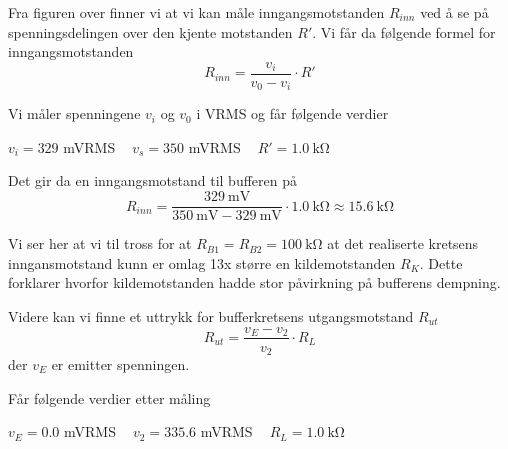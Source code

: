 Fra figuren over finner vi at vi kan måle inngangsmotstanden $R_{inn}$ ved å se på spenningsdelingen 
over den kjente motstanden $R'$. Vi får da følgende formel for inngangsmotstanden
\[
    R_{inn} = \frac{v_i}{v_{0} - v_i} \cdot R'
\]

Vi måler spenningene $v_i$ og $v_0$ i VRMS og får følgende verdier
\begin{center}
    $v_i = 329$ mVRMS $\:\:\:\:v_s = 350$ mVRMS $\:\:\:\:R' = \SI{1.0}{\kilo\ohm}$
\end{center}

Det gir da en inngangsmotstand til bufferen på
\[
    R_{inn} = \frac{\SI{329}{\milli\volt}}{\SI{350}{\milli\volt} - \SI{329}{\milli\volt}} \cdot \SI{1.0}{\kilo\ohm} \approx \SI{15.6}{\kilo\ohm}
\]

Vi ser her at vi til tross for at $R_{B1} = R_{B2} = \SI{100}{\kilo\ohm}$ at det realiserte kretsens 
inngansmotstand kunn er omlag 13x større en kildemotstanden $R_K$. Dette forklarer hvorfor kildemotstanden
hadde stor påvirkning på bufferens dempning.

Videre kan vi finne et uttrykk for bufferkretsens utgangsmotstand $R_{ut}$
\[
    R_{ut} = \frac{v_E - v_2}{v_2} \cdot R_L
\]
der $v_E$ er emitter spenningen.

Får følgende verdier etter måling
\begin{center}
    $v_E = 0.0$ mVRMS $\:\:\:\:v_2 = 335.6$ mVRMS $\:\:\:\:R_L = \SI{1.0}{\kilo\ohm}$
\end{center}
